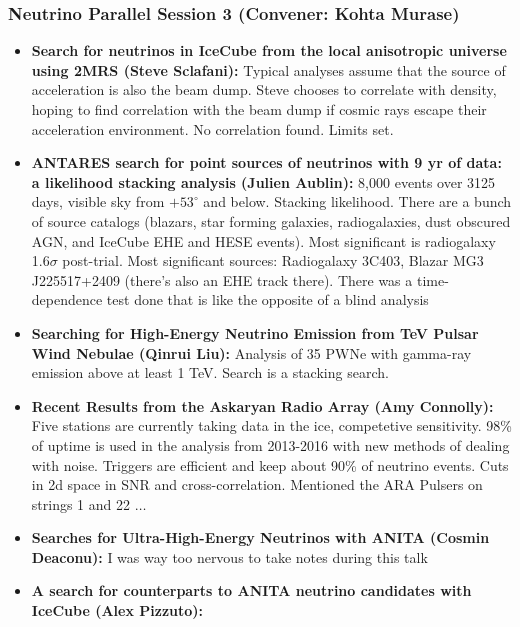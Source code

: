 \subsubsection{Neutrino Parallel Session 3 (Convener:  Kohta Murase)}
\begin{itemize}
    \item \textbf{Search for neutrinos in IceCube from the local anisotropic universe using 2MRS (Steve Sclafani):} Typical analyses assume that the source of acceleration is also the beam dump. Steve chooses to correlate with density, hoping to find correlation with the beam dump if cosmic rays escape their acceleration environment. No correlation found. Limits set. 
    \item \textbf{ ANTARES search for point sources of neutrinos with 9 yr of data: a likelihood stacking analysis (Julien Aublin):} 8,000 events over 3125 days, visible sky from $+53^{\circ}$ and below. Stacking likelihood. There are a bunch of source catalogs (blazars, star forming galaxies, radiogalaxies, dust obscured AGN, and IceCube EHE and HESE events). Most significant is radiogalaxy 1.6$\sigma$ post-trial. Most significant sources: Radiogalaxy 3C403, Blazar MG3 J225517+2409 (there's also an EHE track there). There was a time-dependence test done that is like the opposite of a blind analysis
    \item \textbf{ Searching for High-Energy Neutrino Emission from TeV Pulsar Wind Nebulae (Qinrui Liu):} Analysis of 35 PWNe with gamma-ray emission above at least 1 TeV. Search is a stacking search. 
    \item \textbf{Recent Results from the Askaryan Radio Array (Amy Connolly):} Five stations are currently taking data in the ice, competetive sensitivity. 98\% of uptime is used in the analysis from 2013-2016 with new methods of dealing with noise. Triggers are efficient and keep about 90\% of neutrino events. Cuts in 2d space in SNR and cross-correlation. Mentioned the ARA Pulsers on strings 1 and 22 $\ldots$
    \item \textbf{Searches for Ultra-High-Energy Neutrinos with ANITA (Cosmin Deaconu):} I was way too nervous to take notes during this talk
    \item \textbf{A search for counterparts to ANITA neutrino candidates with IceCube (Alex Pizzuto):} 
\end{itemize}

